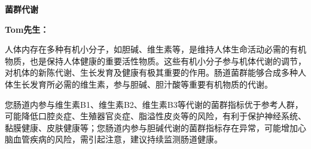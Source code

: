 

\usepackage{graphicx}
\graphicspath{{cores/}}



\setlength{\arrayrulewidth}{0.5pt}
\fontsize{9.3pt}{17pt}\selectfont
\color{gray2}

\vspace*{0mm}
\begin{center}
{\bf\sanhao 菌群代谢}
\end{center}

\medskip
\noindent
{\bf\xiaosihao Tom先生：}

\bigskip

人体内存在多种有机小分子，如胆碱、维生素等，是维持人体生命活动必需的有机物质，也是保持人体健康的重要活性物质。这些有机小分子参与机体代谢的调节，对机体的新陈代谢、生长发育及健康有极其重要的作用。肠道菌群能够合成多种人体生长发育所必需的维生素，参与胆碱、胆汁酸等重要有机物质的代谢。

您肠道内参与维生素B1、维生素B2、维生素B3等代谢的菌群指标优于参考人群，可能降低口腔炎症、生殖器官炎症、脂溢性皮炎等的风险，有利于保护神经系统、黏膜健康、皮肤健康等；您肠道内参与胆碱代谢的菌群指标存在异常，可能增加心脑血管疾病的风险，需引起注意，建议持续监测肠道健康。

